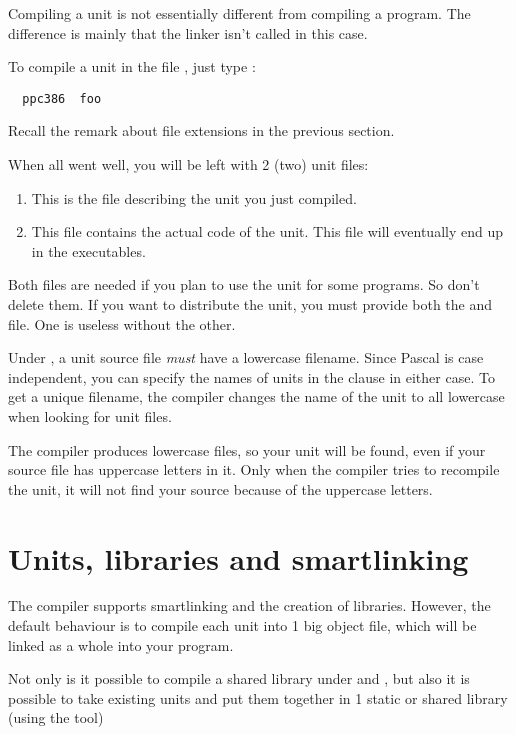 \documentclass{report}
\begin{document}
Compiling a unit is not essentially different from compiling a program.
The difference is mainly that the linker isn't called in this case.

To compile a unit in the file , just type :
\begin{verbatim}
  ppc386  foo
\end{verbatim}
Recall the remark about file extensions in the previous section.

When all went well, you will be left with 2 (two) unit files:
\begin{enumerate}
\item {} This is the file describing the unit you just
compiled.
\item {} This file contains the actual code of the unit.
This file will eventually end up in the executables.
\end{enumerate}
Both files are needed if you plan to use the unit for some programs.
So don't delete them. If you want to distribute the unit, you must
provide both the  and  file. One is useless without the
other.

\begin{remark}
Under \linux, a unit source file {\em must} have a lowercase filename.
Since Pascal is case independent, you can specify the names of units in the
 clause in either case. To get a unique filename, the \fpc compiler
changes the name of the unit to all lowercase when looking for unit files.
\end{remark}
The compiler produces lowercase files, so your unit will be found, even if
your source file has uppercase letters in it. Only when the compiler tries to
recompile the unit, it will not find your source because of the uppercase
letters.

\section{Units, libraries and smartlinking}
The \fpc compiler supports smartlinking and the creation of libraries.
However, the default behaviour is to compile each unit into 1 big object
file, which will be linked as a whole into your program.

Not only is it possible to compile a shared library under \windows and
\linux, but also it is possible to take existing units and put them
together in 1 static or shared library (using the  tool)
\end{document}
